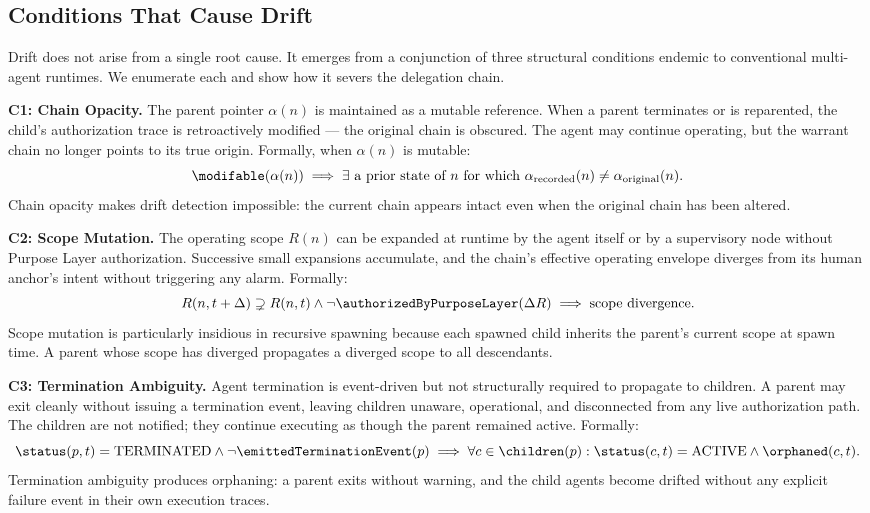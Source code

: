\subsection{Conditions That Cause Drift}
\label{sec:rs-drift-conditions}

Drift does not arise from a single root cause. It emerges from a conjunction of three structural conditions endemic to conventional multi-agent runtimes. We enumerate each and show how it severs the delegation chain.

\bigskip
\noindent\textbf{C1: Chain Opacity.} The parent pointer $\alpha(n)$ is maintained as a mutable reference. When a parent terminates or is reparented, the child's authorization trace is retroactively modified — the original chain is obscured. The agent may continue operating, but the warrant chain no longer points to its true origin. Formally, when $\alpha(n)$ is mutable:
\begin{equation}
\modifable(\alpha(n)) \implies \exists \text{ a prior state of } n \text{ for which } \alpha_{\text{recorded}}(n) \neq \alpha_{\text{original}}(n).
\end{equation}
Chain opacity makes drift detection impossible: the current chain appears intact even when the original chain has been altered.

\bigskip
\noindent\textbf{C2: Scope Mutation.} The operating scope $R(n)$ can be expanded at runtime by the agent itself or by a supervisory node without Purpose Layer authorization. Successive small expansions accumulate, and the chain's effective operating envelope diverges from its human anchor's intent without triggering any alarm. Formally:
\begin{equation}
R(n, t+\Delta) \supsetneq R(n, t) \land \neg \authorizedByPurposeLayer(\Delta R) \implies \text{scope divergence}.
\end{equation}
Scope mutation is particularly insidious in recursive spawning because each spawned child inherits the parent's current scope at spawn time. A parent whose scope has diverged propagates a diverged scope to all descendants.

\bigskip
\noindent\textbf{C3: Termination Ambiguity.} Agent termination is event-driven but not structurally required to propagate to children. A parent may exit cleanly without issuing a termination event, leaving children unaware, operational, and disconnected from any live authorization path. The children are not notified; they continue executing as though the parent remained active. Formally:
\begin{equation}
\status(p, t) = \text{TERMINATED} \land \neg \emittedTerminationEvent(p) \implies \forall c \in \children(p): \status(c, t) = \text{ACTIVE} \land \orphaned(c, t).
\end{equation}
Termination ambiguity produces \silent orphaning: a parent exits without warning, and the child agents become drifted without any explicit failure event in their own execution traces.

